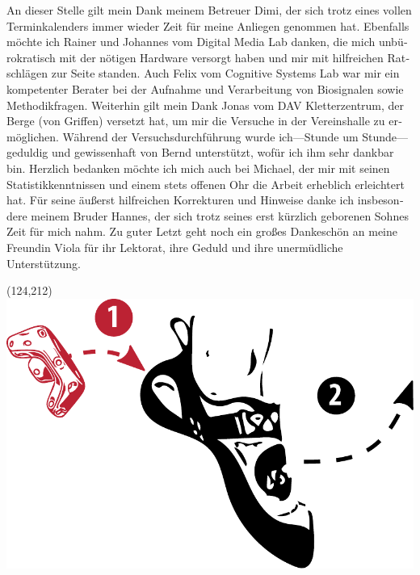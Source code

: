 \begin{german}
	\begin{acknowledgements}
		An dieser Stelle gilt mein Dank meinem Betreuer Dimi, der sich trotz eines vollen Terminkalenders immer wieder Zeit für meine Anliegen genommen hat. Ebenfalls möchte ich Rainer und Johannes vom Digital Media Lab danken, die mich unbürokratisch mit der nötigen Hardware versorgt haben und mir mit hilfreichen Ratschlägen zur Seite standen. Auch Felix vom Cognitive Systems Lab war mir ein kompetenter Berater bei der Aufnahme und Verarbeitung von Biosignalen sowie Methodikfragen. Weiterhin gilt mein Dank Jonas vom DAV Kletterzentrum, der Berge (von Griffen) versetzt hat, um mir die Versuche in der Vereinshalle zu ermöglichen. Während der Versuchsdurchführung wurde ich---Stunde um Stunde---geduldig und gewissenhaft von Bernd unterstützt, wofür ich ihm sehr dankbar bin.
		Herzlich bedanken möchte ich mich auch bei Michael, der mir mit seinen Statistikkenntnissen und einem stets offenen Ohr die Arbeit erheblich erleichtert hat. Für seine äußerst hilfreichen Korrekturen und Hinweise danke ich insbesondere meinem Bruder Hannes, der sich trotz seines erst kürzlich geborenen Sohnes Zeit für mich nahm. Zu guter Letzt geht noch ein großes Dankeschön an meine Freundin Viola für ihr Lektorat, ihre Geduld und ihre unermüdliche Unterstützung.
	\end{acknowledgements}
\end{german}

\begin{textblock}{20}(124,212)
	\includegraphics[scale=0.3]{include/images/climbing-shoe-with-instructions-on.pdf}
\end{textblock}
\pagebreak
